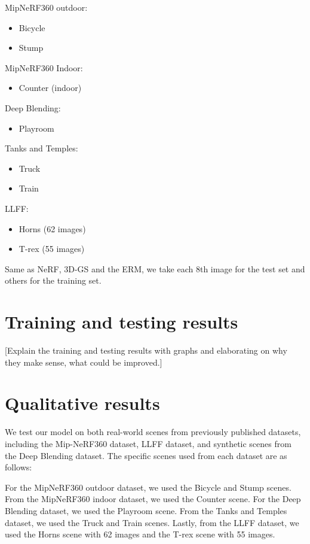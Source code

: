 \documentclass[11pt]{report}
\begin{document}
MipNeRF360 outdoor:
\begin{itemize}
    \item Bicycle 
    \item Stump
\end{itemize}

MipNeRF360 Indoor:
\begin{itemize}
    \item Counter (indoor)
\end{itemize}

Deep Blending:
\begin{itemize}
    \item Playroom
\end{itemize}

Tanks and Temples:
\begin{itemize}
    \item Truck
    \item Train
\end{itemize}

LLFF:
\begin{itemize}
    \item Horns (62 images)
    \item T-rex (55 images)
\end{itemize}

Same as NeRF, 3D-GS and the ERM, we take each 8th image for the test set and others for the training set.

\section{Training and testing results}
[Explain the training and testing results with graphs and elaborating on why they make sense, what could be improved.]

\section{Qualitative results}
We test our model on both real-world scenes from previously published datasets, including the Mip-NeRF360 dataset, LLFF dataset, and synthetic scenes from the Deep Blending dataset. The specific scenes used from each dataset are as follows: 

For the MipNeRF360 outdoor dataset, we used the Bicycle and Stump scenes. From the MipNeRF360 indoor dataset, we used the Counter scene. For the Deep Blending dataset, we used the Playroom scene. From the Tanks and Temples dataset, we used the Truck and Train scenes. Lastly, from the LLFF dataset, we used the Horns scene with 62 images and the T-rex scene with 55 images.
\end{document}
